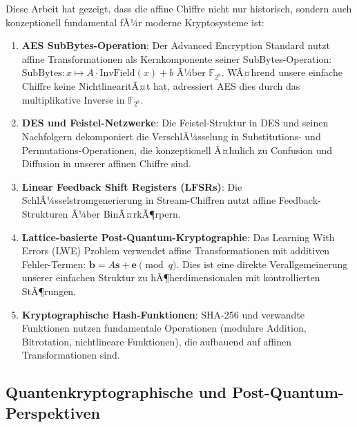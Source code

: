﻿\documentclass[12pt,a4paper]{article}
\begin{document}
	Diese Arbeit hat gezeigt, dass die affine Chiffre nicht nur historisch, sondern auch konzeptionell fundamental fÃ¼r moderne Kryptosysteme ist:
	
	\begin{enumerate}
		\item \textbf{AES SubBytes-Operation}: Der Advanced Encryption Standard nutzt affine Transformationen als Kernkomponente seiner SubBytes-Operation: $\text{SubBytes}: x \mapsto A \cdot \text{InvField}(x) + b$ Ã¼ber $\mathbb{F}_{2^8}$. WÃ¤hrend unsere einfache Chiffre keine NichtlinearitÃ¤t hat, adressiert AES dies durch das multiplikative Inverse in $\mathbb{F}_{2^8}$.
		
		\item \textbf{DES und Feistel-Netzwerke}: Die Feistel-Struktur in DES und seinen Nachfolgern dekomponiert die VerschlÃ¼sselung in Substitutions- und Permutations-Operationen, die konzeptionell Ã¤hnlich zu Confusion und Diffusion in unserer affinen Chiffre sind.
		
		\item \textbf{Linear Feedback Shift Registers (LFSRs)}: Die SchlÃ¼sselstromgenerierung in Stream-Chiffren nutzt affine Feedback-Strukturen Ã¼ber BinÃ¤rkÃ¶rpern.
		
		\item \textbf{Lattice-basierte Post-Quantum-Kryptographie}: Das Learning With Errors (LWE) Problem verwendet affine Transformationen mit additiven Fehler-Termen: $\mathbf{b} = A\mathbf{s} + \mathbf{e} \pmod{q}$. Dies ist eine direkte Verallgemeinerung unserer einfachen Struktur zu hÃ¶herdimensionalen mit kontrollierten StÃ¶rungen.
		
		\item \textbf{Kryptographische Hash-Funktionen}: SHA-256 und verwandte Funktionen nutzen fundamentale Operationen (modulare Addition, Bitrotation, nichtlineare Funktionen), die aufbauend auf affinen Transformationen sind.
	\end{enumerate}
	
	\subsection{Quantenkryptographische und Post-Quantum-Perspektiven}
	
\end{document}
